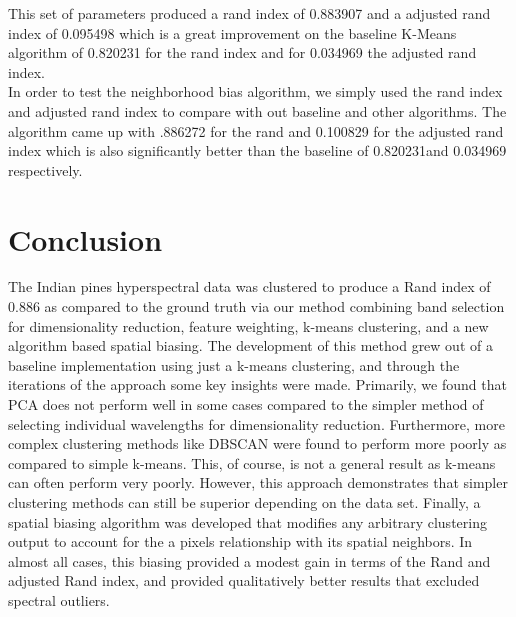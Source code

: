 \documentclass[journal]{IEEEtran}
\begin{document}
  This set of parameters produced a rand index of 0.883907 and a adjusted rand index of 0.095498 which is a great improvement on the baseline K-Means algorithm of 0.820231 for the rand index and for 0.034969 the adjusted rand index.\\

  In order to test the neighborhood bias algorithm, we simply used the rand index and adjusted rand index to compare with out baseline and other algorithms. The algorithm came up with .886272 for the rand and 0.100829 for the adjusted rand index which is also significantly better than the baseline of 0.820231and 0.034969 respectively.\\

\section{Conclusion}
  The Indian pines hyperspectral data was clustered to produce a Rand index of 0.886 as compared to the ground truth via our method combining band selection for dimensionality reduction, feature weighting, k-means clustering, and a new algorithm based spatial biasing. The development of this method grew out of a baseline implementation using just a k-means clustering, and through the iterations of the approach some key insights were made. Primarily, we found that PCA does not perform well in some cases compared to the simpler method of selecting individual wavelengths for dimensionality reduction. Furthermore, more complex clustering methods like DBSCAN were found to perform more poorly as compared to simple k-means. This, of course, is not a general result as k-means can often perform very poorly. However, this approach demonstrates that simpler clustering methods can still be superior depending on the data set. Finally, a spatial biasing algorithm was developed that modifies any arbitrary clustering output to account for the a pixels relationship with its spatial neighbors. In almost all cases, this biasing provided a modest gain in terms of the Rand and adjusted Rand index, and provided qualitatively better results that excluded spectral outliers.\\


\ifCLASSOPTIONcaptionsoff
  \newpage
\fi
\end{document}
